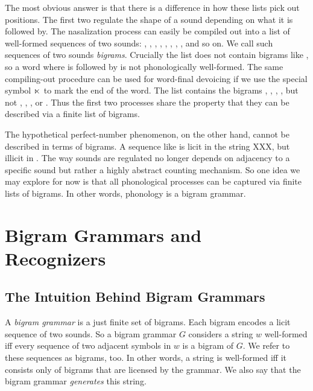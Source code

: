 The most obvious answer is that there is a difference in how these lists pick out positions.
The first two regulate the shape of a sound depending on what it is followed by.
The nasalization process can easily be compiled out into a list of well-formed sequences of two sounds: , , , , , , , , and so on.
We call such sequences of two sounds \emph{bigrams}.
Crucially the list does not contain bigrams like , so a word where  is followed by  is not phonologically well-formed.
The same compiling-out procedure can be used for word-final devoicing if we use the special symbol $\ltimes$ to mark the end of the word.
The list contains the bigrams , , , , but not , , , or .
Thus the first two processes share the property that they can be described via a finite list of bigrams.

The hypothetical perfect-number phenomenon, on the other hand, cannot be described in terms of bigrams.
A sequence like  is licit in the string XXX, but illicit in . %
The way sounds are regulated no longer depends on adjacency to a specific sound but rather a highly abstract counting mechanism.
So one idea we may explore for now is that all phonological processes can be captured via finite lists of bigrams.
In other words, phonology is a bigram grammar.

\section{Bigram Grammars and Recognizers}

\subsection{The Intuition Behind Bigram Grammars}
A \emph{bigram grammar} is a just finite set of bigrams.
Each bigram encodes a licit sequence of two sounds.
So a bigram grammar $G$ considers a string $w$ well-formed iff every sequence of two adjacent symbols in $w$ is a bigram of $G$.
We refer to these sequences as bigrams, too.
In other words, a string is well-formed iff it consists only of bigrams that are licensed by the grammar.
We also say that the bigram grammar \emph{generates} this string.

